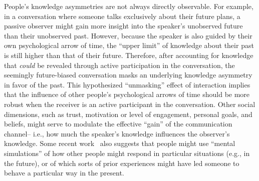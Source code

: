 \documentclass[10pt]{article}
\begin{document}
People's knowledge asymmetries are not always directly observable. For example,
in a conversation where someone talks exclusively about their future plans, a
passive observer might gain more insight into the speaker's unobserved future
than their unobserved past. However, because the speaker is also guided by
their own psychological arrow of time, the ``upper limit'' of knowledge about
their past is still higher than that of their future. Therefore, after
accounting for knowledge that \textit{could} be revealed through active
participation in the conversation, the seemingly future-biased conversation
masks an underlying knowledge asymmetry in favor of the past. This hypothesized
``unmasking'' effect of interaction implies that the influence of other
people's psychological arrows of time should be more robust when the receiver
is an active participant in the conversation. Other social dimensions, such as
trust, motivation or level of engagement, personal goals, and beliefs, might
serve to modulate the effective ``gain'' of the communication channel-- i.e.,
how much the speaker's knowledge influences the observer's knowledge. Some
recent work~\citep[e.g.,][]{TamiMitc13, MeyeEtal19b} also suggests that people
might use ``mental simulations'' of how other people might respond in
particular situations (e.g., in the future), or of which sorts of prior
experiences might have led someone to behave a particular way in the present.
\end{document}
